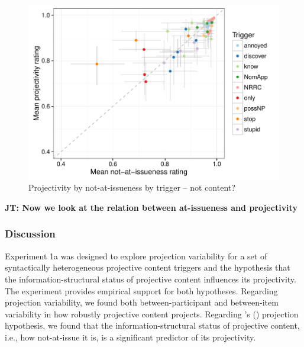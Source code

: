 \documentclass[11pt,fleqn]{article}
\newcommand{\6}{\mbox{$[\hspace*{-.6mm}[$}}
\newcommand{\9}{\mbox{$]\hspace*{-.6mm}]$}}
\newcommand{\citetpos}[1]{\citeauthor{#1}'s (\citeyear{#1})}
\newcommand{\jt}[1]{\textbf{\color{blue}JT: #1}}
\begin{document}
\begin{figure}[!h]

\begin{center}
\includegraphics[width=12cm]{../results/exp1a/graphs/ai-proj-bytrigger-nofacets}

\end{center}

\caption{Projectivity by not-at-issueness by trigger -- not content?}\label{f-proj-ai-1a}
\end{figure}

\jt{Now we look at the relation between at-issueness and projectivity}


\newpage


\subsubsection{Discussion}\label{s-discussion1a}

Experiment 1a was designed to explore projection variability for a set of syntactically heterogeneous projective content triggers and the hypothesis that the information-structural status of projective content influences its projectivity. The experiment provides empirical support for both hypotheses. Regarding projection variability, we found both between-participant and between-item variability in how robustly projective content projects. Regarding \citetpos{brst-salt10} projection hypothesis, we found that the information-structural status of projective content, i.e., how not-at-issue it is, is a significant predictor of its projectivity.
\end{document}
